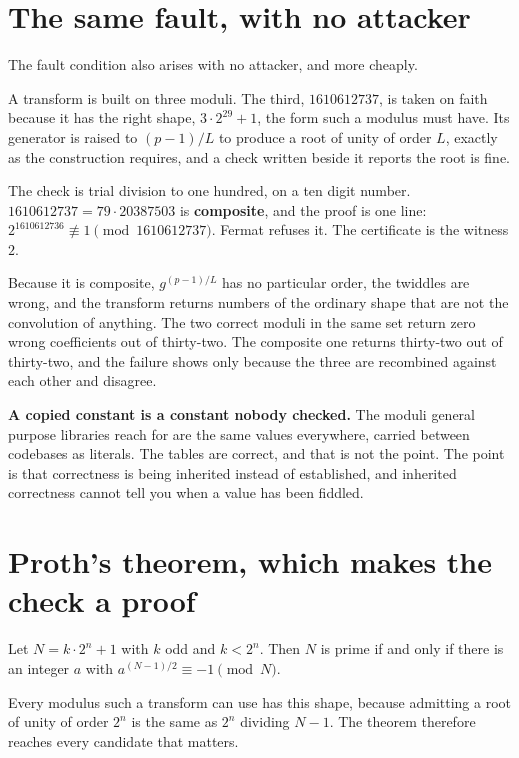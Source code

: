 \section{The same fault, with no attacker}

The fault condition also arises with no attacker, and more cheaply.

A transform is built on three moduli. The third, \(1610612737\), is taken on faith because it has the right shape, \(3 \cdot 2^{29} + 1\), the form such a modulus must have. Its generator is raised to \((p-1)/L\) to produce a root of unity of order \(L\), exactly as the construction requires, and a check written beside it reports the root is fine.

The check is trial division to one hundred, on a ten digit number. \(1610612737 = 79 \cdot 20387503\) is \textbf{composite}, and the proof is one line: \(2^{1610612736} \not\equiv 1 \pmod{1610612737}\). Fermat refuses it. The certificate is the witness \(2\).

Because it is composite, \(g^{(p-1)/L}\) has no particular order, the twiddles are wrong, and the transform returns numbers of the ordinary shape that are not the convolution of anything. The two correct moduli in the same set return zero wrong coefficients out of thirty-two. The composite one returns thirty-two out of thirty-two, and the failure shows only because the three are recombined against each other and disagree.

\textbf{A copied constant is a constant nobody checked.} The moduli general purpose libraries reach for are the same values everywhere, carried between codebases as literals. The tables are correct, and that is not the point. The point is that correctness is being inherited instead of established, and inherited correctness cannot tell you when a value has been fiddled.

\section{Proth's theorem, which makes the check a proof}

\begin{theorem}
Let \(N = k \cdot 2^n + 1\) with \(k\) odd and \(k < 2^n\). Then \(N\) is prime if and only if there is an integer \(a\) with \(a^{(N-1)/2} \equiv -1 \pmod N\).
\end{theorem}

Every modulus such a transform can use has this shape, because admitting a root of unity of order \(2^n\) is the same as \(2^n\) dividing \(N-1\). The theorem therefore reaches every candidate that matters.

